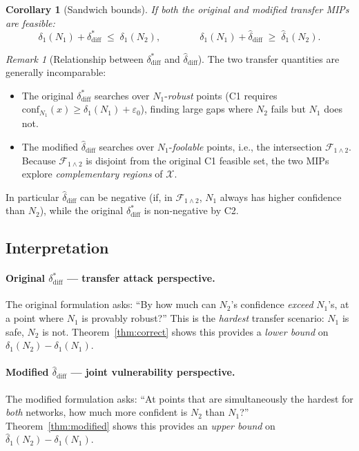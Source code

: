 \documentclass[12pt]{article}
\theoremstyle{definition}
\theoremstyle{plain}
\newtheorem{corollary}[theorem]{Corollary}
\theoremstyle{remark}
\newtheorem{remark}{Remark}[section]
\newcommand{\conf}[2]{\mathrm{conf}_{#1}(#2)}
\newcommand{\dN}[1]{\delta_1(N_{#1})}
\newcommand{\dNmod}[1]{\hat{\delta}_1(N_{#1})}
\newcommand{\ddiff}{\delta_{\mathrm{diff}}^{*}}
\newcommand{\ddiffmod}{\hat{\delta}_{\mathrm{diff}}}
\newcommand{\Xdom}{\mathcal{X}}
\newcommand{\Fjoint}{\mathcal{F}_{1\wedge 2}}
\begin{document}
\begin{corollary}[Sandwich bounds]\label{cor:sandwich}
If both the original and modified transfer MIPs are feasible:
\[
  \dN{1}+\ddiff
  \;\leq\;
  \dN{2},
  \qquad\qquad
  \dN{1}+\ddiffmod
  \;\geq\;
  \dNmod{2}.
\]
\end{corollary}

\begin{remark}[Relationship between $\ddiff$ and $\ddiffmod$]
The two transfer quantities are generally incomparable:
\begin{itemize}
  \item The original $\ddiff$ searches over $N_1$-\emph{robust} points
        (C1 requires $\conf{N_1}{x}\geq\dN{1}+\varepsilon_0$), finding
        large gaps where $N_2$ fails but $N_1$ does not.
  \item The modified $\ddiffmod$ searches over $N_1$-\emph{foolable}
        points, i.e., the intersection $\Fjoint$.  Because $\Fjoint$
        is disjoint from the original C1 feasible set, the two MIPs
        explore \emph{complementary regions} of $\Xdom$.
\end{itemize}
In particular $\ddiffmod$ can be negative (if, in $\Fjoint$, $N_1$
always has higher confidence than $N_2$), while the original $\ddiff$
is non-negative by C2.
\end{remark}

\subsection{Interpretation}

\paragraph{Original $\ddiff$ — transfer attack perspective.}
The original formulation asks: ``By how much can $N_2$'s confidence
\emph{exceed} $N_1$'s, at a point where $N_1$ is provably robust?''
This is the \emph{hardest} transfer scenario: $N_1$ is safe, $N_2$ is
not.  Theorem~\ref{thm:correct} shows this provides a
\emph{lower bound} on $\dN{2}-\dN{1}$.

\paragraph{Modified $\ddiffmod$ — joint vulnerability perspective.}
The modified formulation asks: ``At points that are simultaneously
the hardest for \emph{both} networks, how much more confident is
$N_2$ than $N_1$?''  Theorem~\ref{thm:modified} shows this provides
an \emph{upper bound} on $\dNmod{2}-\dN{1}$.
\end{document}
